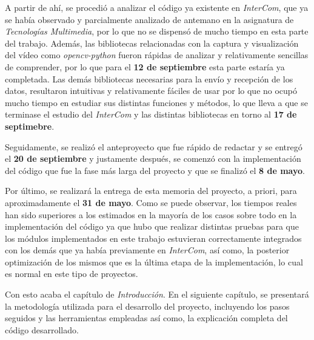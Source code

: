 A partir de ahí, se procedió a analizar el código ya existente en \textit{InterCom}, que ya se había observado y parcialmente analizado de antemano en la asignatura de \textit{Tecnologías Multimedia}, por lo que no se dispensó de mucho tiempo en esta parte del trabajo. Además, las bibliotecas relacionadas con la captura y visualización del vídeo como \textit{opencv-python} fueron rápidas de analizar y relativamente sencillas de comprender, por lo que para el \textbf{12 de septiembre} esta parte estaría ya completada. Las demás bibliotecas necesarias para la envío y recepción de los datos, resultaron intuitivas y relativamente fáciles de usar por lo que no ocupó mucho tiempo en estudiar sus distintas funciones y métodos, lo que lleva a que se terminase el estudio del \textit{InterCom} y las distintas bibliotecas en torno al \textbf{17 de septimebre}. 
\vspace{\baselineskip}

Seguidamente, se realizó el anteproyecto que fue rápido de redactar y se entregó el \textbf{20 de septiembre} y justamente después, se comenzó con la implementación del código que fue la fase más larga del proyecto y que se finalizó el \textbf{8 de mayo}. 
\vspace{\baselineskip}

Por último, se realizará la entrega de esta memoria del proyecto, a priori, para aproximadamente el \textbf{31 de mayo}. Como se puede observar, los tiempos reales han sido superiores a los estimados en la mayoría de los casos sobre todo en la implementación del código ya que hubo que realizar distintas pruebas para que los módulos implementados en este trabajo estuvieran correctamente integrados con los demás que ya había previamente en \textit{InterCom}, así como, la posterior optimización de los mismos que es la última etapa de la implementación, lo cual es normal en este tipo de proyectos.

\vspace{\baselineskip}
Con esto acaba el capítulo de \textit{Introducción}. En el siguiente capítulo, se presentará la metodología utilizada para el desarrollo del proyecto, incluyendo los pasos seguidos y las herramientas empleadas así como, la explicación completa del código desarrollado. 